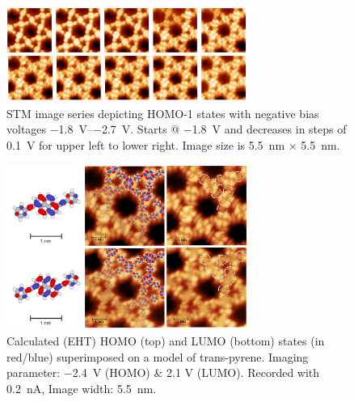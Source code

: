 \begin{figure}[]\centering
	\includegraphics[width=0.7\textwidth]{./images/paper/pyrene/figure-S7}
	\caption{STM image series depicting HOMO-1 states with negative bias voltages \SIrange{-1.8}{-2.7}{\volt}. Starts @ \SI{-1.8}{\volt} and decreases in steps of \SI{0.1}{\volt} for upper left to lower right. Image size is \SI{5.5}{\nano \meter} $\times$ \SI{5.5}{\nano \meter}.
	}
	\label{fig:pyene-S7}
\end{figure}

\begin{figure}[]\centering
	\includegraphics[width=0.7\textwidth]{./images/paper/pyrene/figure-S8}
	\caption{Calculated (EHT) HOMO (top) and LUMO (bottom) states (in red/blue) superimposed on a model of trans-pyrene. Imaging parameter: \SI{-2.4}{\volt} (HOMO) \& 2.1 V (LUMO). Recorded with \SI{0.2}{\nano \ampere}, Image width: \SI{5.5}{\nano \meter}.
	}
	\label{fig:pyene-S8}
\end{figure}

